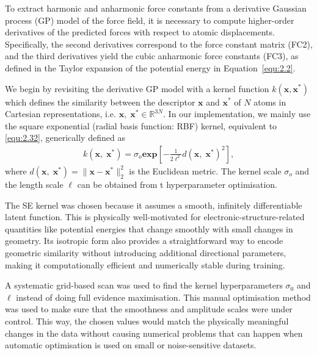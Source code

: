To extract harmonic and anharmonic force constants from a derivative Gaussian process (GP) model of the force field, it is necessary to compute higher-order derivatives of the predicted forces with respect to atomic displacements. Specifically, the second derivatives correspond to the force constant matrix (FC2), and the third derivatives yield the cubic anharmonic force constants (FC3), as defined in the Taylor expansion of the potential energy in Equation~\eqref{equ:2.2}. 

We begin by revisiting the derivative GP model with a kernel function $k(\mathbf{x},\mathbf{x}^{*})$ which defines the similarity between the descriptor $\mathbf{x}$ and $\mathbf{x}^{*}$ of $N$ atoms in Cartesian representations, i.e. $\mathbf{x},\;\mathbf{x}^{*}\in\mathbb{R}^{3N}$.
In our implementation, we mainly use the square exponential (radial basis function: RBF) kernel, equivalent to \eqref{equ:2.32}, generically defined as
\begin{equation} \label{equ:3.1}
        \begin{split}
            k(\mathbf{x},\;\mathbf{x}^{*})= \sigma_{o}\mathbf{exp}\left[-\frac{1}{2\ell^{2}}d(\mathbf{x},\;\mathbf{x}^{*})^{2}\right],
        \end{split}
\end{equation}
where $d(\mathbf{x},\;\mathbf{x}^{*})=\lVert\mathbf{x}-\mathbf{x}^{*}\rVert^{2}_{2}$ is the Euclidean metric.
The kernel scale $\sigma_{o}$ and the length scale $\ell$ can be obtained from t hyperparameter optimisation.

The SE kernel was chosen because it assumes a smooth, infinitely differentiable latent function. This is physically well-motivated for electronic-structure-related quantities like potential energies that change smoothly with small changes in geometry. 
Its isotropic form also provides a straightforward way to encode geometric similarity without introducing additional directional parameters, making it computationally efficient and numerically stable during training.

A systematic grid-based scan was used to find the kernel hyperparameters $\sigma_{0}$ and $\ell$ instead of doing full evidence maximisation. 
This manual optimisation method was used to make sure that the smoothness and amplitude scales were under control. This way, the chosen values would match the physically meaningful changes in the data without causing numerical problems that can happen when automatic optimisation is used on small or noise-sensitive datasets.

